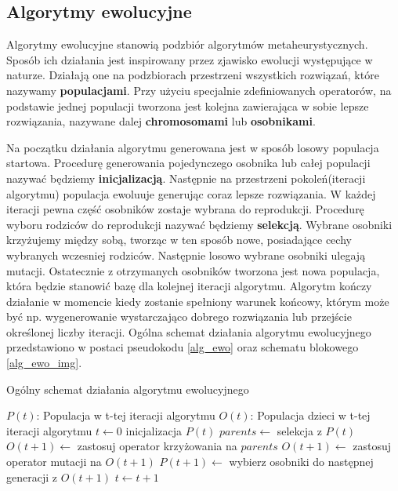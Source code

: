 \subsection{Algorytmy ewolucyjne}
Algorytmy ewolucyjne stanowią podzbiór algorytmów metaheurystycznych. Sposób ich działania jest inspirowany przez zjawisko ewolucji występujące 
w naturze. Działają one na podzbiorach przestrzeni wszystkich rozwiązań, które nazywamy \textbf{populacjami}. Przy użyciu specjalnie zdefiniowanych 
operatorów, na podstawie jednej populacji tworzona jest kolejna zawierająca w sobie lepsze rozwiązania, nazywane dalej \textbf{chromosomami} 
lub \textbf{osobnikami}.

Na początku działania algorytmu generowana jest w sposób losowy populacja startowa. Procedurę generowania pojedynczego osobnika lub 
całej populacji nazywać będziemy \textbf{inicjalizacją}. Następnie na przestrzeni pokoleń(iteracji algorytmu) 
populacja ewoluuje generując coraz lepsze rozwiązania. W każdej iteracji pewna część osobników zostaje wybrana do reprodukcji. Procedurę wyboru 
rodziców do reprodukcji nazywać będziemy \textbf{selekcją}. Wybrane osobniki krzyżujemy między sobą, tworząc w ten sposób nowe, 
posiadające cechy wybranych wczesniej rodziców. Następnie losowo wybrane osobniki ulegają mutacji. 
Ostatecznie z otrzymanych osobników tworzona jest nowa populacja, która będzie stanowić bazę dla kolejnej iteracji algorytmu. Algorytm kończy 
działanie w momencie kiedy zostanie spełniony warunek końcowy, którym może być np. wygenerowanie wystarczająco dobrego rozwiązania lub 
przejście określonej liczby iteracji. Ogólna schemat działania algorytmu ewolucyjnego przedstawiono w postaci pseudokodu \ref{alg_ewo} oraz 
schematu blokowego \ref{alg_ewo_img}.

\begin{pseudokod}[H]
\caption{Ogólny schemat działania algorytmu ewolucyjnego}
\label{alg_ewo}
    $P(t)$: Populacja w t-tej iteracji algorytmu\;
    $O(t)$: Populacja dzieci w t-tej iteracji algorytmu\;
    \BlankLine
    $t \gets 0$\;
    inicjalizacja $P(t)$\;
    \BlankLine
     {
        $parents \gets$ selekcja z $P(t)$\;
        $O(t+1) \gets$ zastosuj operator krzyżowania na $parents$\;
        $O(t+1) \gets$ zastosuj operator mutacji na $O(t+1)$\;
        $P(t+1) \gets$ wybierz osobniki do następnej generacji z $O(t+1)$\;
        $t \gets t+1$\;
    }
    \;
\end{pseudokod}

